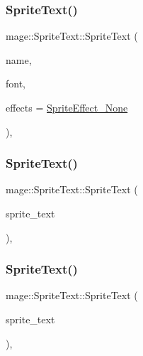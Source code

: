 \subsubsection{\texorpdfstring{Sprite\+Text()}{SpriteText()}\hspace{0.1cm}{\footnotesize\ttfamily [1/3]}}
{\footnotesize\ttfamily mage\+::\+Sprite\+Text\+::\+Sprite\+Text (\begin{DoxyParamCaption}\item[{const string \&}]{name,  }\item[{\hyperlink{namespacemage_a1e01ae66713838a7a67d30e44c67703e}{Shared\+Ptr}$<$ \hyperlink{classmage_1_1_sprite_font}{Sprite\+Font} $>$}]{font,  }\item[{\hyperlink{namespacemage_a9cfe18123066ba4236f548f9de75d881}{Sprite\+Effect}}]{effects = {\ttfamily \hyperlink{namespacemage_a9cfe18123066ba4236f548f9de75d881af3c275fbfacfe174da928b2f24dfa515}{Sprite\+Effect\+\_\+\+None}} }\end{DoxyParamCaption})\hspace{0.3cm}{\ttfamily [explicit]}, {\ttfamily [protected]}}

\hypertarget{classmage_1_1_sprite_text_a76ee01b719ee90418740a2c10392acae}{}\label{classmage_1_1_sprite_text_a76ee01b719ee90418740a2c10392acae} 
\subsubsection{\texorpdfstring{Sprite\+Text()}{SpriteText()}\hspace{0.1cm}{\footnotesize\ttfamily [2/3]}}
{\footnotesize\ttfamily mage\+::\+Sprite\+Text\+::\+Sprite\+Text (\begin{DoxyParamCaption}\item[{const \hyperlink{classmage_1_1_sprite_text}{Sprite\+Text} \&}]{sprite\+\_\+text }\end{DoxyParamCaption})\hspace{0.3cm}{\ttfamily [protected]}, {\ttfamily [default]}}

\hypertarget{classmage_1_1_sprite_text_ab569dfa4ff5a30f0a23005c43635aad7}{}\label{classmage_1_1_sprite_text_ab569dfa4ff5a30f0a23005c43635aad7} 
\subsubsection{\texorpdfstring{Sprite\+Text()}{SpriteText()}\hspace{0.1cm}{\footnotesize\ttfamily [3/3]}}
{\footnotesize\ttfamily mage\+::\+Sprite\+Text\+::\+Sprite\+Text (\begin{DoxyParamCaption}\item[{\hyperlink{classmage_1_1_sprite_text}{Sprite\+Text} \&\&}]{sprite\+\_\+text }\end{DoxyParamCaption})\hspace{0.3cm}{\ttfamily [protected]}, {\ttfamily [default]}}



